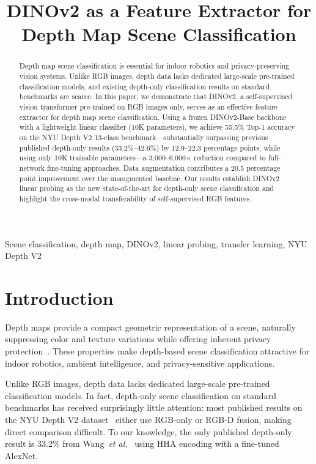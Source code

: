 \documentclass[conference, a4paper]{IEEEtran}
\title{DINOv2 as a Feature Extractor for \\ Depth Map Scene Classification}
\author{
    \IEEEauthorblockN{丁驿}
    \IEEEauthorblockA{武汉理工大学国际教育学院 \\
        Email: dyvertin@outlook.com
    }
}
\begin{document}
\maketitle

\begin{abstract}
Depth map scene classification is essential for indoor robotics and privacy-preserving vision systems.
Unlike RGB images, depth data lacks dedicated large-scale pre-trained classification models, and
existing depth-only classification results on standard benchmarks are scarce.
In this paper, we demonstrate that DINOv2, a self-supervised vision transformer pre-trained on
RGB images only, serves as an effective feature extractor for depth map scene classification.
Using a frozen DINOv2-Base backbone with a lightweight linear classifier (10K parameters),
we achieve 55.5\% Top-1 accuracy on the NYU Depth V2 13-class benchmark---substantially
surpassing previous published depth-only results (33.2\%--42.6\%) by 12.9--22.3
percentage points, while using only 10K trainable parameters---a 3,000--6,000$\times$
reduction compared to full-network fine-tuning approaches.
Data augmentation contributes a 20.5 percentage point improvement over the unaugmented baseline.
Our results establish DINOv2 linear probing as the new state-of-the-art for depth-only
scene classification and highlight the cross-modal transferability of self-supervised
RGB features.
\end{abstract}

\begin{IEEEkeywords}
Scene classification, depth map, DINOv2, linear probing, transfer learning, NYU Depth V2
\end{IEEEkeywords}

\section{Introduction}

Depth maps provide a compact geometric representation of a scene, naturally suppressing color and
texture variations while offering inherent privacy protection~\cite{robotics_depth}.
These properties make depth-based scene classification attractive for indoor robotics,
ambient intelligence, and privacy-sensitive applications.

Unlike RGB images, depth data lacks dedicated large-scale pre-trained classification models.
In fact, depth-only scene classification on standard benchmarks has received surprisingly
little attention: most published results on the NYU Depth V2 dataset~\cite{nyu_depth} either
use RGB-only or RGB-D fusion, making direct comparison difficult.
To our knowledge, the only published depth-only result is 33.2\% from Wang~\textit{et al.}~\cite{wang3d}
using HHA encoding with a fine-tuned AlexNet.
\end{document}
